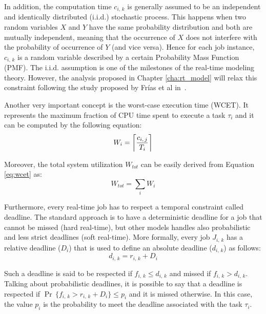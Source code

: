 In addition, the computation time \( c_{i,\,k} \) is generally assumed to be an
independent and identically distributed (i.i.d.) stochastic process.
This happens when two random variables \( X \) and \( Y \) have 
the same probability distribution and both are mutually
independent, meaning that the occurrence of \( X \) does not interfere with 
the probability of occurrence of \( Y \) (and vice versa).
Hence for each job instance, \( c_{i,\,k} \) is a random
variable described by a certain Probability Mass Function (PMF).
The i.i.d. assumption is one of the milestones of the real-time modeling theory.
However, the analysis proposed in Chapter \ref{cha:rt_model} will relax this 
constraint following the study proposed by Fr\'{i}as et al
in~\cite{frias2017probabilistic}.

Another very important concept is the worst-case execution time (WCET).
It represents the maximum fraction of CPU time spent to execute a task
\( \tau_{i} \) and it can be computed by the following equation:
\begin{equation}\label{eq:wcet}
    W_{i} = \ceil[\bigg]{\frac{c_{i,\,j}}{T_{i}}}
\end{equation}

Moreover, the total system utilization \( W_{tot} \) can be easily derived from
Equation \ref{eq:wcet} as:
\begin{equation}\label{eq:system_utilization}
    W_{tot} = \displaystyle\sum_{i} W_{i}
\end{equation}

Furthermore, every real-time job has to respect a temporal constraint called
deadline. The standard approach is to have a deterministic deadline for a job
that cannot be missed (hard real-time), but other models handles also
probabilistic and less strict deadlines (soft real-time).
More formally, every job \( J_{i,\,k} \) has a relative deadline (\( D_{i} \)) that
is used to define an absolute deadline (\( d_{i,\,k} \)) as follows:
\begin{equation}
    d_{i,\,k} = r_{i,\,k} + D_{i}
\end{equation}

Such a deadline is said to be respected if \( f_{i,\,k} \leq d_{i,\,k} \) and missed
if \( f_{i,\,k} > d_{i,\,k} \). Talking about probabilistic deadlines, it is
possible to say that a deadline is respected if 
\( \Pr\,\{f_{i,\,k} > r_{i,\,k} + D_{i} \} \leq p_{i} \) and it is missed otherwise.
In this case, the value \( p_{i} \) is the probability to meet the deadline associated
with the task \( \tau_{i} \).


